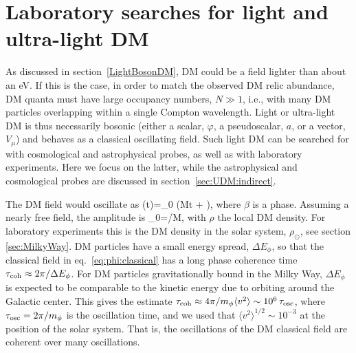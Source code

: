 \section{Laboratory searches for light and ultra-light DM}
\label{sec:UDM:direct}
As discussed in section~\ref{LightBosonDM}, DM could be a field lighter than about an eV.
If this is the case, in order to match the observed DM relic abundance, DM quanta must have large occupancy numbers, $N\gg 1$, i.e., with many DM particles overlapping within a single Compton wavelength.
Light or ultra-light DM is thus necessarily bosonic (either a scalar, $\varphi$, a pseudoscalar, $a$, or a vector, $V_\mu$)
and behaves as a classical oscillating field.
Such light DM can be searched for with cosmological and astrophysical probes, as well as with laboratory experiments. 
Here we focus on the latter, while the astrophysical and cosmological probes are discussed in section~\ref{sec:UDM:indirect}. 


The DM field would oscillate as
\beq
\label{eq:phi:classical}
\phi(t)=\phi_0 \cos(Mt + \beta),
\eeq
where $\beta$ is a phase. Assuming a nearly free field, the amplitude is 
 \beq\label{eq:phi0rho}
 \phi_0=\sqrt{2 \rho}/M,
 \eeq
with $\rho$ the local DM density. 
For laboratory experiments this is the DM density in the solar system, $\rho_{\odot}$, see section \ref{sec:MilkyWay}.  
DM particles have a small energy spread, $\Delta E_\phi$, so that  the classical field in eq.~\eqref{eq:phi:classical} has a long phase coherence time
$\tau_{\rm coh}\approx 2\pi /\Delta E_\phi$.
For DM particles gravitationally bound in the Milky Way, $\Delta E_\phi$ is expected to be comparable to the kinetic energy due to orbiting around the Galactic center. This gives the estimate $\tau_{\rm coh}\approx 4\pi /m_\phi \langle v ^2\rangle\sim 10^6\, \tau_{\rm osc}$, where $\tau_{\rm osc}=2\pi/m_\phi$ is the oscillation time, 
and we used that $\langle v ^2\rangle^{1/2}\sim 10^{-3}$ at the position of the solar system. 
That is, the oscillations of the DM classical field are coherent over many oscillations. 

\smallskip

